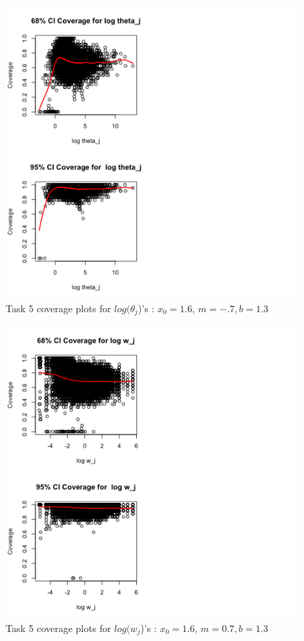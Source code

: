 \documentclass[paper=a4, fontsize=11pt]{scrartcl}
\begin{document}
\begin{figure}[h!]
  \caption{Task 5 coverage plots for $log(\theta_{j}$)'s : $x_0 = 1.6$, $m = -.7, b = 1.3$}
  \centering
	\includegraphics[scale=1, trim = 0 0 200 0]{keskici_wxiao_ps2_task5_plot5.png}
\end{figure}

\begin{figure}[h!]
  \caption{Task 5 coverage plots for $log(w_{j}$)'s : $x_0 = 1.6$, $m = 0.7, b = 1.3$}
  \centering
	\includegraphics[scale=1, trim = 0 0 200 0]{keskici_wxiao_ps2_task5_plot6.png}
\end{figure}
\clearpage
\end{document}
